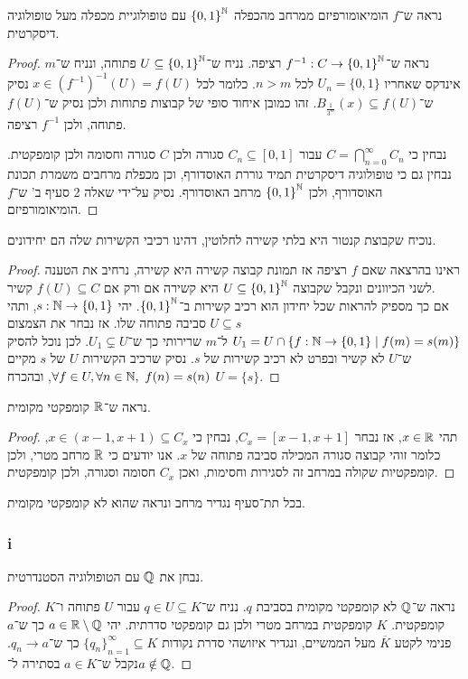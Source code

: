 \subquestion{}
נראה ש־$f$ הומיאומורפיזם ממרחב מהכפלה ${\{0, 1\}}^{\mathbb{N}}$ עם טופולוגיית מכפלה מעל טופולוגיה דיסקרטית.
\begin{proof}
	נראה ש־$f^{-1} : C \to {\{0, 1\}}^{\mathbb{N}}$ רציפה.
	נניח ש־$U \subseteq {\{0, 1\}}^{\mathbb{N}}$ פתוחה, ונניח ש־$m$ אינדקס שאחריו $U_n = \{0, 1\}$ לכל $n > m$.
	כלומר לכל $x \in {(f^{-1})}^{-1}(U) = f(U)$ נסיק ש־$B_{\frac{1}{3^m}}(x) \subseteq f(U)$.
	זהו כמובן איחוד סופי של קבוצות פתוחות ולכן נסיק ש־$f(U)$ פתוחה, ולכן $f^{-1}$ רציפה.

	נבחין כי $C = \bigcap_{n = 0}^\infty C_n$ עבור $C_n \subseteq [0, 1]$ סגורה ולכן $C$ סגורה וחסומה ולכן קומפקטית.
	נבחין גם כי טופולוגיה דיסקרטית תמיד גוררת האוסדורף, וכן מכפלת מרחבים משמרת תכונת האוסדורף, ולכן ${\{0, 1\}}^{\mathbb{N}}$ מרחב האוסדורף.
	נסיק על־ידי שאלה 2 סעיף ב' ש־$f$ הומיאומורפיזם.
\end{proof}

\subquestion{}
נוכיח שקבוצת קנטור היא בלתי קשירה לחלוטין, דהינו רכיבי הקשירות שלה הם יחידונים.
\begin{proof}
	ראינו בהרצאה שאם $f$ רציפה אז תמונת קבוצה קשירה היא קשירה, נרחיב את הטענה לשני הכיוונים ונקבל שקבוצה $U \subseteq {\{0, 1\}}^{\mathbb{N}}$ היא קשירה אם ורק אם $f(U) \subseteq C$ קשיר. \\
	אם כך מספיק להראות שכל יחידון הוא רכיב קשירות ב־${\{0, 1\}}^{\mathbb{N}}$.
	יהי $s : \mathbb{N} \to \{0, 1\}$, ותהי $U \subseteq s$ סביבה פתוחה שלו.
	אז נבחר את הצמצום $U_1 = U \cap \{ f : \mathbb{N} \to \{0, 1\} \mid f(m) = s(m) \}$ ל־$m$ שרירותי כך ש־$U_1 \subsetneq U$.
	לכן נוכל להסיק ש־$U$ לא קשיר ובפרט לא רכיב קשירות של $s$.
	נסיק שרכיב הקשירות $U$ של $s$ מקיים $\forall f \in U, \forall n \in \NN,\ f(n) = s(n)$, ובהכרח $U = \{ s \}$.
\end{proof}

\question{}
\subquestion{}
נראה ש־$\mathbb{R}$ קומפקטי מקומית.
\begin{proof}
	תהי $x \in \mathbb{R}$, אז נבחר $C_x = [x - 1, x + 1]$, נבחין כי $x \in (x - 1, x + 1) \subseteq C_x$, כלומר זוהי קבוצה סגורה המכילה סביבה פתוחה של $x$.
	אנו יודעים כי $\mathbb{R}$ מרחב מטרי, ולכן קומפקטיות שקולה במרחב זה לסגירות וחסימות, ואכן $C_x$ חסומה וסגורה, ולכן קומפקטית.
\end{proof}

\subquestion{}
בכל תת־סעיף נגדיר מרחב ונראה שהוא לא קומפקטי מקומית.

\subsubsection{i}
נבחן את $\mathbb{Q}$ עם הטופולוגיה הסטנדרטית.
\begin{proof}
	נראה ש־$\mathbb{Q}$ לא קומפקטי מקומית בסביבת $q$.
	נניח ש־$q \in U \subseteq K$ עבור $U$ פתוחה ו־$K$ קומפקטית.
	$K$ קומפקטית במרחב מטרי ולכן גם קומפקטי סדרתית.
	יהי $a \in \mathbb{R} \setminus \mathbb{Q}$ כך ש־$a$ פנימי לקטע $\overline{K}$ מעל הממשיים, ונגדיר איזושהי סדרת נקודות ${\{ q_n \}}_{n = 1}^\infty \subseteq K$ כך ש־$q_n \to a$.
	נקבל ש־$a \in K$ בסתירה ל־$a \notin \mathbb{Q}$.
\end{proof}


